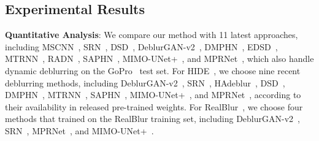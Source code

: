 \subsection{Experimental Results}
\noindent\textbf{Quantitative Analysis}:
We compare our method with 11 latest approaches, including MSCNN~\cite{Nah_2017_CVPR}, SRN~\cite{tao2018srndeblur}, DSD~\cite{gao2019dynamic}, DeblurGAN-v2~\cite{Kupyn_2019_ICCV}, DMPHN~\cite{Zhang_2019_CVPR},
EDSD~\cite{Yuan_2020_CVPR}, 
MTRNN~\cite{MT_2020_ECCV}, RADN~\cite{RADN_2020_ECCV},
SAPHN~\cite{SAPN2020},
MIMO-UNet+~\cite{MIMO}, and MPRNet~\cite{Zamir_2021_CVPR}, which also handle dynamic deblurring on the GoPro~\cite{Nah_2017_CVPR} test set. 
For HIDE~\cite{HAdeblur}, we choose nine recent deblurring methods, including DeblurGAN-v2~\cite{Kupyn_2019_ICCV}, SRN~\cite{tao2018srndeblur}, HAdeblur~\cite{HAdeblur}, DSD~\cite{gao2019dynamic}, DMPHN~\cite{Zhang_2019_CVPR}, MTRNN~\cite{MT_2020_ECCV}, SAPHN~\cite{SAPN2020}, MIMO-UNet+~\cite{MIMO}, and MPRNet~\cite{Zamir_2021_CVPR}, according to their availability in released pre-trained weights.
For RealBlur~\cite{rim_2020_ECCV}, we choose four methods that trained on the RealBlur training set, including DeblurGAN-v2~\cite{Kupyn_2019_ICCV}, SRN~\cite{tao2018srndeblur}, MPRNet~\cite{Zamir_2021_CVPR}, and MIMO-UNet+~\cite{MIMO}.

